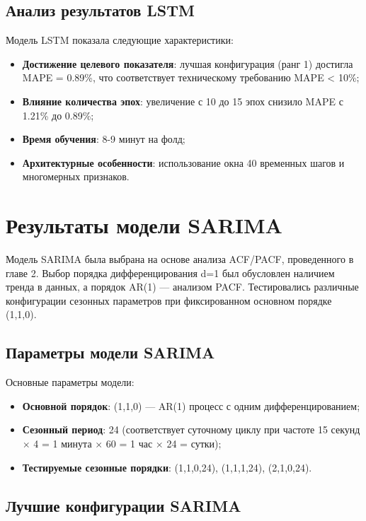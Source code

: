 \subsection{Анализ результатов LSTM}

Модель LSTM показала следующие характеристики:

\begin{itemize}
	\item \textbf{Достижение целевого показателя}: лучшая конфигурация (ранг 1) достигла MAPE = 0.89\%, что соответствует техническому требованию MAPE < 10\%;
	\item \textbf{Влияние количества эпох}: увеличение с 10 до 15 эпох снизило MAPE с 1.21\% до 0.89\%;
	\item \textbf{Время обучения}: 8-9 минут на фолд;
	\item \textbf{Архитектурные особенности}: использование окна 40 временных шагов и многомерных признаков.
\end{itemize}

\section{Результаты модели SARIMA}
\label{sec:sarima_results}

Модель SARIMA была выбрана на основе анализа ACF/PACF, проведенного в главе 2. Выбор порядка дифференцирования d=1 был обусловлен наличием тренда в данных, а порядок AR(1) — анализом PACF. Тестировались различные конфигурации сезонных параметров при фиксированном основном порядке (1,1,0).

\subsection{Параметры модели SARIMA}

Основные параметры модели:
\begin{itemize}
	\item \textbf{Основной порядок}: (1,1,0) --- AR(1) процесс с одним дифференцированием;
	\item \textbf{Сезонный период}: 24 (соответствует суточному циклу при частоте 15 секунд $\times$ 4 = 1 минута $\times$ 60 = 1 час $\times$ 24 = сутки);
	\item \textbf{Тестируемые сезонные порядки}: (1,1,0,24), (1,1,1,24), (2,1,0,24).
\end{itemize}

\subsection{Лучшие конфигурации SARIMA}

